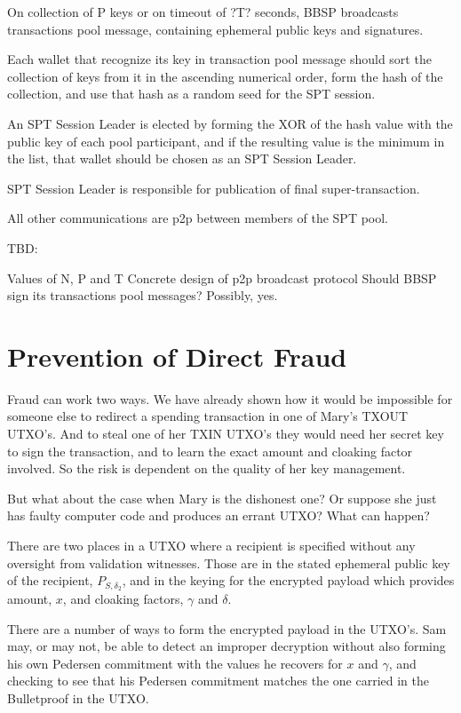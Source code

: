 \documentclass[a4paper, 10pt, conference]{ieeeconf}
\begin{document}
On collection of P keys or on timeout of ?T? seconds, BBSP broadcasts transactions pool message, containing ephemeral public keys and signatures.

Each wallet that recognize its key in transaction pool message should sort the collection of keys from it in the ascending numerical order, form the hash of the collection, and use that hash as a random seed for the SPT session.

An SPT Session Leader is elected by forming the XOR of the hash value with the public key of each pool participant, and if the resulting value is the minimum in the list, that wallet should be chosen as an SPT Session Leader.

SPT Session Leader is responsible for publication of final super-transaction.

All other communications are p2p between members of the SPT pool.

TBD:

Values of N, P and T
Concrete design of p2p broadcast protocol
Should BBSP sign its transactions pool messages? Possibly, yes.

\section{Prevention of Direct Fraud}
Fraud can work two ways. We have already shown how it would be impossible for someone else to redirect a spending transaction in one of Mary's TXOUT UTXO's. And to steal one of her TXIN UTXO's they would need her secret key to sign the transaction, and to learn the exact amount and cloaking factor involved. So the risk is dependent on the quality of her key management.

But what about the case when Mary is the dishonest one? Or suppose she just has faulty computer code and produces an errant UTXO? What can happen?

There are two places in a UTXO where a recipient is specified without any oversight from validation witnesses. Those are in the stated ephemeral public key of the recipient, $P_{S, \delta_2}$, and in the keying for the encrypted payload which provides amount, $x$, and cloaking factors, $\gamma$ and $\delta$. 

There are a number of ways to form the encrypted payload in the UTXO's. Sam may, or may not, be able to detect an improper decryption without also forming his own Pedersen commitment with the values he recovers for $x$ and $\gamma$, and checking to see that his Pedersen commitment matches the one carried in the Bulletproof in the UTXO.
\end{document}
